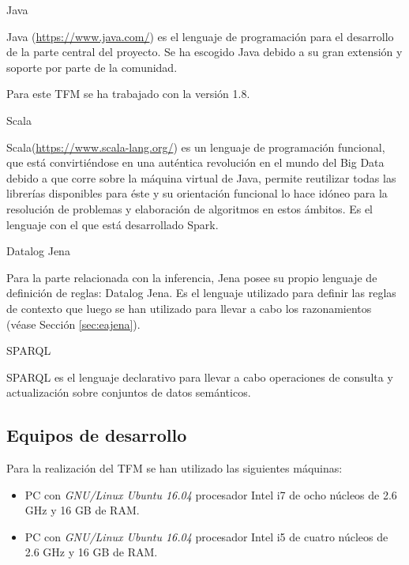 \begin{definitionlist} 

\item[Java]

Java (\url{https://www.java.com/}) es el lenguaje de programación para el
desarrollo de la parte central del proyecto. Se ha escogido Java debido a su
gran extensión y soporte por parte de la comunidad. 

Para este \acs{TFM} se ha trabajado con la versión 1.8.

\item[Scala]

  Scala(\url{https://www.scala-lang.org/}) es un lenguaje de programación
  funcional, que está convirtiéndose en una auténtica revolución en el mundo del
  Big Data debido a que corre sobre la máquina virtual de Java, permite
  reutilizar todas las librerías disponibles para éste y su orientación
  funcional lo hace idóneo para la resolución de problemas y elaboración de
  algoritmos en estos ámbitos. Es el lenguaje con el
  que está desarrollado Spark. 


\item[Datalog Jena]

Para la parte relacionada con la inferencia, Jena posee su propio lenguaje de
definición de reglas: Datalog Jena. Es el lenguaje utilizado para definir las
reglas de contexto que luego se han utilizado para llevar a cabo los
razonamientos (véase Sección \ref{sec:eajena}). 



\item[\acs{SPARQL}]

\acs{SPARQL} es el lenguaje declarativo para llevar a cabo operaciones de
consulta y actualización sobre conjuntos de datos semánticos. 

\end{definitionlist}

\subsection{Equipos de desarrollo}

Para la realización del \acs{TFM} se han utilizado las siguientes máquinas: 

\begin{itemize}
\item PC con \textit{GNU/Linux Ubuntu 16.04} procesador Intel i7
  de ocho núcleos de 2.6 GHz y 16 GB de RAM.
\item PC con \textit{GNU/Linux Ubuntu 16.04} procesador Intel i5
  de cuatro núcleos de 2.6 GHz y 16 GB de RAM.   
\end{itemize}
